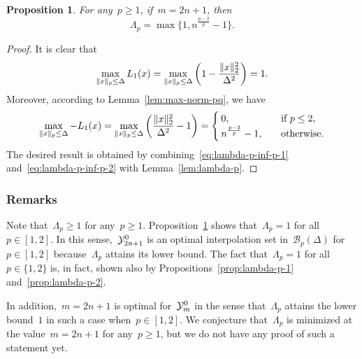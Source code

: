 \documentclass{article}
\numberwithin{equation}{section}
\theoremstyle{definition}
\theoremstyle{plain}
\newtheorem{proposition}{Proposition}[section]
\theoremstyle{remark}
\newcommand*{\lagp}[1][]{L\ifblank{#1}{}{_{#1}}}
\newcommand*{\norm}[2][]{#1\lVert#2#1\rVert}
\newcommand*{\set}[2][]{#1\{#2#1\}}
\newcommand*{\xpt}[1][]{\mathcal{Y}\ifblank{#1}{}{^{#1}}}
\begin{document}
\begin{proposition}
    \label{prop:lambda-p-opt}
    For any~$p \ge 1$, if~$m = 2n + 1$, then
    \begin{equation*}
        \Lambda_p = \max \set[\big]{1, n^{\frac{p - 2}{p}} - 1}.
    \end{equation*}
\end{proposition}

\begin{proof}
    It is clear that
    \begin{equation}
        \label{eq:lambda-p-inf-p-1}
        \max_{\norm{x}_p \le \Delta} \lagp[1](x) = \max_{\norm{x}_p \le \Delta} \bigg( 1 - \frac{\norm{x}_2^2}{\Delta^2} \bigg) = 1.
    \end{equation}
    Moreover, according to Lemma~\ref{lem:max-norm-pq}, we have
    \begin{equation}
        \label{eq:lambda-p-inf-p-2}
        \max_{\norm{x}_p \le \Delta} -\lagp[1](x) = \max_{\norm{x}_p \le \Delta} \bigg( \frac{\norm{x}_2^2}{\Delta^2} - 1 \bigg) =
        \begin{cases}
            0,                          & \quad \text{if~$p \le 2$,}\\
            n^{\frac{p - 2}{p}} - 1,    & \quad \text{otherwise.}
        \end{cases}
    \end{equation}
    The desired result is obtained by combining~\eqref{eq:lambda-p-inf-p-1} and~\eqref{eq:lambda-p-inf-p-2} with Lemma~\ref{lem:lambda-p}.
\end{proof}

\subsubsection{Remarks}

Note that~$\Lambda_p \ge 1$ for any~$p \ge 1$.
Proposition~\ref{prop:lambda-p-opt} shows that~$\Lambda_p = 1$ for all~$p \in [1, 2]$.
In this sense,~$\xpt[0]_{2n + 1}$ is an optimal interpolation set in~$\mathcal{B}_p(\Delta)$ for~$p \in [1, 2]$ because~$\Lambda_p$ attains its lower bound.
The fact that~$\Lambda_p = 1$ for all~$p \in \set{1, 2}$ is, in fact, shown also by Propositions~\ref{prop:lambda-p-1} and~\ref{prop:lambda-p-2}.

In addition,~$m = 2n + 1$ is optimal for~$\xpt[0]_m$ in the sense that~$\Lambda_p$ attains the lower bound~$1$ in such a case when~$p \in [1, 2]$.
We conjecture that~$\Lambda_p$ is minimized at the value~$m = 2n + 1$ for any~$p \ge 1$, but we do not have any proof of such a statement yet.
\end{document}
